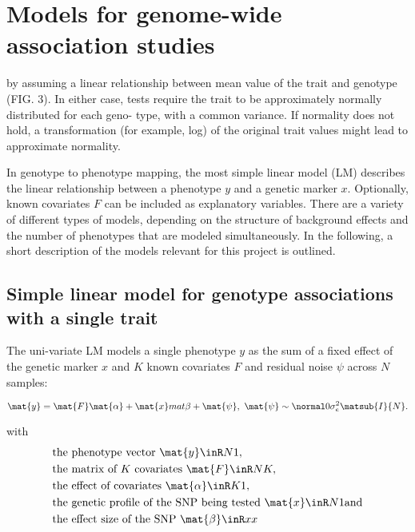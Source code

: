 \section{Models for genome-wide association studies}
\label{section:LinearModels}

by assuming a linear relationship between mean value of the trait and genotype (FIG. 3). In either case, tests require the trait to be approximately normally distributed for each geno- type, with a common variance. If normality does not hold, a transformation (for example, log) of the original trait values might lead to approximate normality.


In genotype to phenotype mapping, the most simple linear model (LM) describes the linear relationship between a phenotype \(y\) and a genetic marker \(x\). Optionally, known covariates \(F\) can be included as explanatory variables. There are a variety of different types of models, depending on the structure of background effects and the number of phenotypes that are modeled simultaneously. In the following, a short description of the models relevant for this project is outlined. 

\subsection{Simple linear model for genotype associations with a single trait}
\label{subsection:lm-uv}
The uni-variate LM models a single phenotype \(y\) as the sum of a fixed effect of the genetic marker \(x\) and \(K\) known covariates \(F\) and residual noise \(\psi\) across \(N\) samples:

\begin{equation}
\mat{y} = \mat{F}\mat{\alpha} + \mat{x}mat{\beta} + \mat{\psi},\text{ }
\mat{\psi} \sim \normal 0 {\sigma_e^2\matsub{I}{N}}.
\label{eq:lm-uv}
\end{equation}

with
\begin{align*} 
& \text{the phenotype vector } \mat{y} \inR N 1,\\
& \text{the matrix of $K$ covariates }\mat{F} \inR N K,\\
& \text{the effect of covariates } \mat{\alpha} \inR K 1,\\
& \text{the genetic profile of the SNP being tested }\mat{x} \inR N 1 \text{and}\\
& \text{the effect size of the SNP } \mat{\beta} \inR x x \\
\end{align*} 


